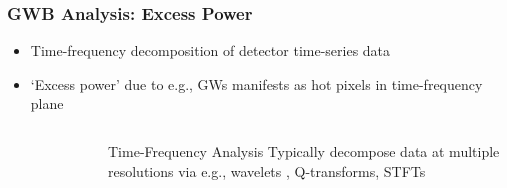 \documentclass{beamer}
\begin{document}
\begin{frame}
    \frametitle{GWB Analysis: Excess Power}
    \begin{itemize}
        \item Time-frequency decomposition of detector time-series data 
        \item `Excess power' due to e.g., GWs manifests as hot pixels in
            time-frequency plane
    \end{itemize}

    \begin{columns}[]
        \begin{figure}
        \end{figure}
        \begin{block}{Time-Frequency Analysis}
            Typically decompose data at multiple resolutions via e.g., wavelets
            , Q-transforms, STFTs%
        \end{block}
    \end{columns}

\end{frame}
\end{document}
